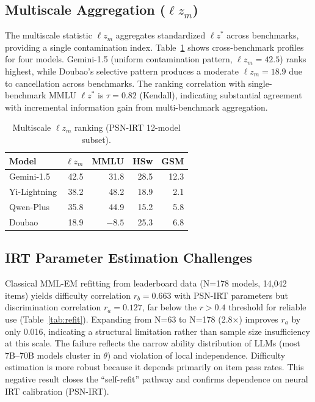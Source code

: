 \documentclass[11pt,a4paper]{article}
\newcommand{\lzm}{$\ell z_m$}
\begin{document}
\subsection{Multiscale Aggregation ($\ell z_m$)}

The multiscale statistic \lzm{} \citep{hong2021lzm} aggregates standardized $\ell z^*$ across benchmarks, providing a single contamination index. Table~\ref{tab:lzm} shows cross-benchmark profiles for four models. Gemini-1.5 (uniform contamination pattern, \lzm{}$=42.5$) ranks highest, while Doubao's selective pattern produces a moderate \lzm{}$=18.9$ due to cancellation across benchmarks. The ranking correlation with single-benchmark MMLU $\ell z^*$ is $\tau = 0.82$ (Kendall), indicating substantial agreement with incremental information gain from multi-benchmark aggregation.

\begin{table}[t]
\centering
\caption{Multiscale \lzm{} ranking (PSN-IRT 12-model subset).}
\label{tab:lzm}
\small
\begin{tabular}{lrrrr}
\toprule
Model & \lzm{} & MMLU & HSw & GSM \\
\midrule
Gemini-1.5 & 42.5 & 31.8 & 28.5 & 12.3 \\
Yi-Lightning & 38.2 & 48.2 & 18.9 & 2.1 \\
Qwen-Plus & 35.8 & 44.9 & 15.2 & 5.8 \\
Doubao & 18.9 & $-8.5$ & 25.3 & 6.8 \\
\bottomrule
\end{tabular}
\end{table}

\subsection{IRT Parameter Estimation Challenges}

Classical MML-EM refitting from leaderboard data (N=178 models, 14,042 items) yields difficulty correlation $r_b = 0.663$ with PSN-IRT parameters but discrimination correlation $r_a = 0.127$, far below the $r > 0.4$ threshold for reliable use (Table~\ref{tab:refit}). Expanding from N=63 to N=178 (2.8$\times$) improves $r_a$ by only 0.016, indicating a structural limitation rather than sample size insufficiency at this scale. The failure reflects the narrow ability distribution of LLMs (most 7B--70B models cluster in $\theta$) and violation of local independence. Difficulty estimation is more robust because it depends primarily on item pass rates. This negative result closes the ``self-refit'' pathway and confirms dependence on neural IRT calibration (PSN-IRT).
\end{document}
